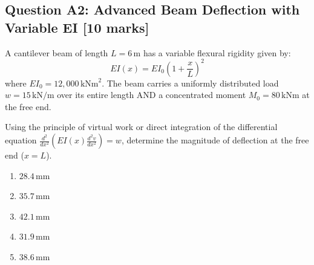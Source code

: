 \documentclass[12pt,a4paper]{article}
\begin{document}
\begin{questionbox}
\subsection*{Question A2: Advanced Beam Deflection with Variable EI [10 marks]}

A cantilever beam of length $L = 6\,\text{m}$ has a variable flexural rigidity given by:
$$EI(x) = EI_0\left(1 + \frac{x}{L}\right)^2$$
where $EI_0 = 12,000\,\text{kNm}^2$. The beam carries a uniformly distributed load $w = 15\,\text{kN/m}$ 
over its entire length AND a concentrated moment $M_0 = 80\,\text{kNm}$ at the free end.

\begin{center}
\end{center}

Using the principle of virtual work or direct integration of the differential equation 
$\frac{d^2}{dx^2}\left(EI(x)\frac{d^2v}{dx^2}\right) = w$, determine the magnitude of deflection 
at the free end ($x = L$).

\begin{mcqbox}
\begin{enumerate}[label=(\Alph*),leftmargin=*]
    \item $28.4\,\text{mm}$
    \item $35.7\,\text{mm}$
    \item $42.1\,\text{mm}$
    \item $31.9\,\text{mm}$
    \item $38.6\,\text{mm}$
\end{enumerate}
\end{mcqbox}
\end{questionbox}
\end{document}
